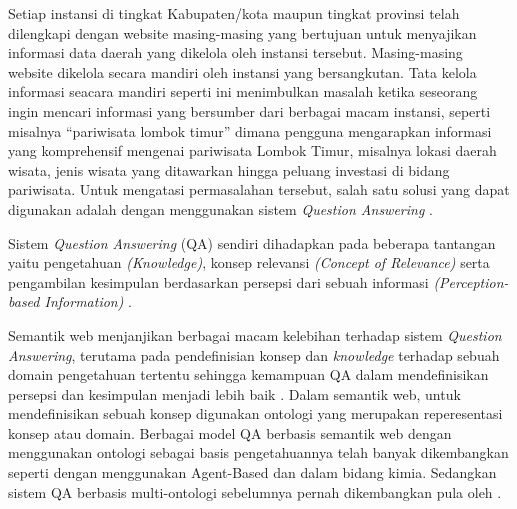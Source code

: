 Setiap instansi di tingkat Kabupaten/kota maupun tingkat provinsi telah dilengkapi dengan website masing-masing yang bertujuan untuk menyajikan informasi data daerah yang dikelola oleh instansi tersebut. Masing-masing website dikelola secara mandiri oleh instansi yang bersangkutan. Tata kelola informasi seacara mandiri seperti ini menimbulkan masalah ketika seseorang ingin mencari informasi yang bersumber dari berbagai macam instansi, seperti misalnya ``pariwisata lombok timur'' dimana pengguna mengarapkan informasi yang komprehensif mengenai pariwisata Lombok Timur, misalnya lokasi daerah wisata, jenis wisata yang ditawarkan hingga peluang investasi di bidang pariwisata. Untuk mengatasi permasalahan tersebut, salah satu solusi yang dapat digunakan adalah dengan menggunakan sistem \textit{Question Answering} \citep{zadeh}.

Sistem \textit{Question Answering} (QA) sendiri dihadapkan pada beberapa tantangan yaitu pengetahuan \textit{(Knowledge)}, konsep relevansi \textit{(Concept of Relevance)} serta pengambilan kesimpulan berdasarkan persepsi dari sebuah informasi \textit{(Perception-based Information)} \citep{zadeh}.

Semantik web menjanjikan berbagai macam kelebihan terhadap sistem \textit{Question Answering}, terutama pada pendefinisian konsep dan \textit{knowledge} terhadap sebuah domain pengetahuan tertentu sehingga kemampuan QA dalam mendefinisikan persepsi dan kesimpulan menjadi lebih baik \citep*{guo_zhang}. Dalam semantik web, untuk mendefinisikan sebuah konsep digunakan ontologi yang merupakan reperesentasi konsep atau domain. Berbagai model QA berbasis semantik web dengan menggunakan ontologi sebagai basis pengetahuannya telah banyak dikembangkan seperti \citet*{guo_zhang} dengan menggunakan Agent-Based dan \citet*{angele} dalam bidang kimia. Sedangkan sistem QA berbasis multi-ontologi sebelumnya pernah dikembangkan pula oleh \citet*{lopez}.

